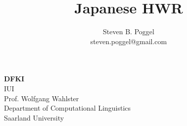 
\title{Japanese HWR}
\author{Steven B. Poggel\\
steven.poggel@gmail.com}

%

\maketitle

\begin{center}
\textbf{DFKI} \\
IUI \\
Prof. Wolfgang Wahlster \\
Department of Computational Linguistics\\
Saarland University
\end{center}

\thispagestyle{empty}
\newpage
\textsc{ }
\thispagestyle{empty}
\newpage


%
\thispagestyle{empty}
\tableofcontents

\newpage

\textsc{ }
%
%
\thispagestyle{empty}

\newpage

%

\fontsize{11pt}{13}\selectfont
